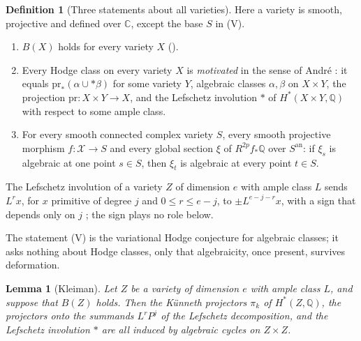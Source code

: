 \documentclass[11pt,reqno]{amsart}
\theoremstyle{plain}
\newtheorem{lemma}[theorem]{Lemma}
\theoremstyle{definition}
\newtheorem{definition}[theorem]{Definition}
\theoremstyle{remark}
\newcommand{\QQ}{\mathbb{Q}}
\newcommand{\CC}{\mathbb{C}}
\newcommand{\cX}{\mathcal{X}}
\begin{document}
\begin{definition}[Three statements about all varieties]\label{def:lmv}
Here a variety is smooth, projective and defined over $\CC$, except the base
$S$ in \textup{(V)}.
\begin{enumerate}[leftmargin=3.0em,itemsep=3pt]
\item[\textup{(L)}] $B(X)$ holds for every variety $X$ (\cite[Definition~10.6]{paperI}).
\item[\textup{(M)}] Every Hodge class on every variety $X$ is
  \emph{motivated} in the sense of Andr\'e \cite[\S2.1]{And96b}: it equals
  $\mathrm{pr}_{*}(\alpha\cup{*}\beta)$ for some variety $Y$, algebraic
  classes $\alpha,\beta$ on $X\times Y$, the projection
  $\mathrm{pr}\colon X\times Y\to X$, and the Lefschetz involution ${*}$ of
  $H^{*}(X\times Y,\QQ)$ with respect to some ample class.
\item[\textup{(V)}] For every smooth connected complex variety $S$, every
  smooth projective morphism $f\colon\cX\to S$ and every global section $\xi$
  of $R^{2p}f_{*}\QQ$ over $S^{\mathrm{an}}$: if $\xi_{s}$ is algebraic at one
  point $s\in S$, then $\xi_{t}$ is algebraic at every point $t\in S$.
\end{enumerate}
The Lefschetz involution of a variety $Z$ of dimension $e$ with ample class
$L$ sends $L^{r}x$, for $x$ primitive of degree $j$ and $0\le r\le e-j$, to
$\pm L^{e-j-r}x$, with a sign that depends only on $j$ \cite{And96b}; the
sign plays no role below.
\end{definition}

The statement (V) is the variational Hodge conjecture for algebraic classes;
it asks nothing about Hodge classes, only that algebraicity, once present,
survives deformation.

\begin{lemma}[Kleiman]\label{lem:lefinvolution}
Let $Z$ be a variety of dimension $e$ with ample class $L$, and suppose that
$B(Z)$ holds. Then the K\"unneth projectors $\pi_{k}$ of $H^{*}(Z,\QQ)$, the
projectors onto the summands $L^{r}P^{j}$ of the Lefschetz decomposition, and
the Lefschetz involution ${*}$ are all induced by algebraic cycles on
$Z\times Z$.
\end{lemma}
\end{document}
